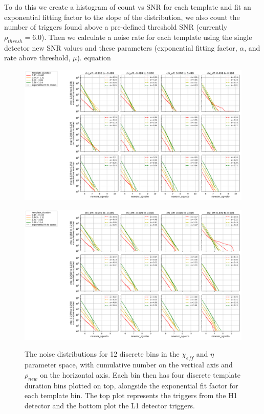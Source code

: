 To do this we create a histogram of count vs SNR for each template and fit an exponential fitting factor to the slope of the distribution, we also count the number of triggers found above a pre-defined threshold SNR (currently $\rho_{thresh} = 6.0$). Then we calculate a noise rate for each template using the single detector new SNR values and these parameters (exponential fitting factor, $\alpha$, and rate above threshold, $\mu$).
%
equation
%
%

\begin{figure}
  \centering
  \begin{minipage}[t]{1.0\linewidth}
  
    \includegraphics[width=1.0\textwidth]{images/pycbclive/H1-template_fits.png}
    \label{fig:pycbclive-H1-fits}
  
    \includegraphics[width=1.0\linewidth]{images/pycbclive/L1-template_fits.png}
    \label{fig:pycbclive-L1-fits}

  \end{minipage}
  \caption{The noise distributions for 12 discrete bins in the $\chi_{eff}$ and $\eta$ parameter space, with cumulative number on the vertical axis and $\rho_{new}$ on the horizontal axis. Each bin then has four discrete template duration bins plotted on top, alongside the exponential fit factor for each template bin. The top plot represents the triggers from the H1 detector and the bottom plot the L1 detector triggers.}
  \label{fig:pycbclive-template-fits}
\end{figure}
%

